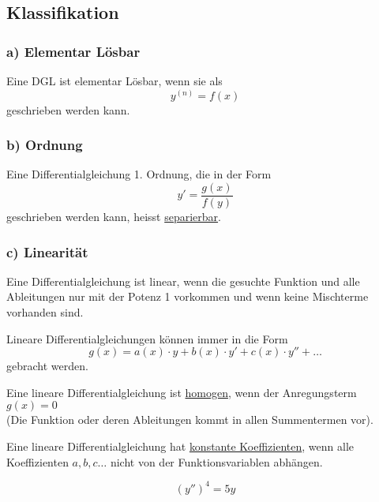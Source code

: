 \subsection{Klassifikation}
\subsubsection*{a) Elementar Lösbar}
Eine DGL ist elementar Lösbar, wenn sie als 
\begin{equation*}
    y^{\left( n \right)} = f(x)
\end{equation*}
geschrieben werden kann.

\subsubsection*{b) Ordnung}


 Eine Differentialgleichung 1. Ordnung, die in der Form 
\begin{equation*}
    y' = \frac{g(x)}{f(y)}
\end{equation*}
geschrieben werden kann, heisst \underline{separierbar}.

\subsubsection*{c) Linearität}
Eine Differentialgleichung ist linear, wenn die gesuchte Funktion und alle
Ab\-lei\-tun\-gen nur mit der Potenz 1 vorkommen und wenn keine Mischterme vorhanden
sind.

Lineare Differentialgleichungen können immer in die Form 
\begin{equation*}
    g(x) = a(x)\cdot y + b(x) \cdot y' + c(x)\cdot y'' + \ldots
\end{equation*}
gebracht werden.

 Eine lineare Differentialgleichung ist
\underline{homogen}, wenn der Anregungsterm $g(x)=0$ \\
(Die Funktion oder deren Ableitungen kommt in allen Summentermen vor).

 Eine lineare Differentialgleichung hat \underline{%
konstante Koeffizienten}, wenn alle Koeffizienten $a,b,c\ldots$ nicht von der
Funktionsvariablen abhängen.

\begin{equation*}
    \left( y'' \right)^{4} = 5y%
\end{equation*}

